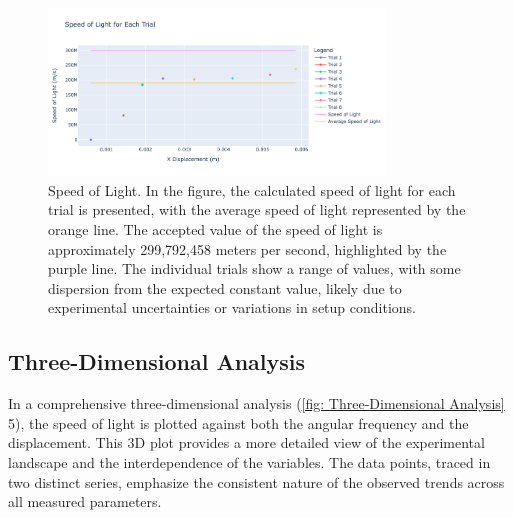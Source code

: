 \documentclass[12pt]{article}
\begin{document}
        \begin{figure}[!h]
                \centering
                \includegraphics[width=0.80\textwidth]{../Imgs/plot4.png}
                \caption{Speed of Light. In the figure, the calculated speed of light for each trial is presented,
                with the average speed of light represented by the orange line. The accepted value of the speed of light
                is approximately 299,792,458 meters per second, highlighted by the purple line. The individual trials
                show a range of values, with some dispersion from the expected constant value, likely due to experimental
                uncertainties or variations in setup conditions.}
                \label{fig: Speed of Light}
        \end{figure}

        \newpage

        \subsection{Three-Dimensional Analysis}
        In a comprehensive three-dimensional analysis (\ref{fig: Three-Dimensional Analysis} 5), the speed of light is 
        plotted against both the angular frequency and the displacement. This 3D plot provides a more detailed view of 
        the experimental landscape and the interdependence of the variables. The data points, traced in two distinct 
        series, emphasize the consistent nature of the observed trends across all measured parameters.
\end{document}
